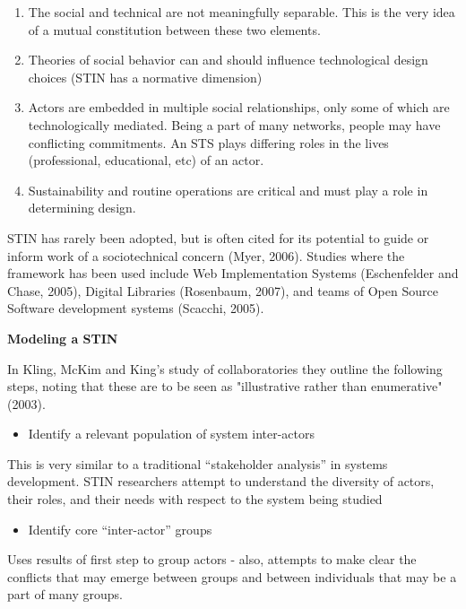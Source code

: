 \begin{enumerate}
\def\labelenumi{\arabic{enumi}.}
\item
  The social and technical are not meaningfully separable. This is the
  very idea of a mutual constitution between these two elements.
\item
  Theories of social behavior can and should influence technological
  design choices (STIN has a normative dimension)
\item
  Actors are embedded in multiple social relationships, only some of
  which are technologically mediated. Being a part of many networks,
  people may have conflicting commitments. An STS plays differing roles
  in the lives (professional, educational, etc) of an actor.
\item
  Sustainability and routine operations are critical and must play a
  role in determining design.
\end{enumerate}

STIN has rarely been adopted, but is often cited for its potential to
guide or inform work of a sociotechnical concern (Myer, 2006). Studies
where the framework has been used include Web Implementation Systems
(Eschenfelder and Chase, 2005), Digital Libraries (Rosenbaum, 2007), and teams of
Open Source Software development systems (Scacchi, 2005).

\textbf{Modeling a STIN}

In Kling, McKim and King's study of collaboratories they outline the
following steps, noting that these are to be seen as "illustrative rather
than enumerative" (2003).\\

\begin{itemize}
\itemsep1pt\parskip0pt
\item
  Identify a relevant population of system inter-actors
\end{itemize}

This is very similar to a traditional ``stakeholder analysis'' in
systems development. STIN researchers attempt to understand the
diversity of actors, their roles, and their needs with respect to the
system being studied

\begin{itemize}
\itemsep1pt\parskip0pt
\item
  Identify core ``inter-actor'' groups
\end{itemize}

Uses results of first step to group actors - also, attempts to make
clear the conflicts that may emerge between groups and between
individuals that may be a part of many groups.

